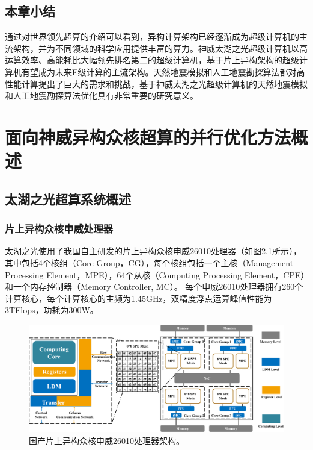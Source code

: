 \documentclass[degree=doctor]{thuthesis}
\begin{document}
\section{本章小结}

通过对世界领先超算的介绍可以看到，异构计算架构已经逐渐成为超级计算机的主流架构，并为不同领域的科学应用提供丰富的算力。神威太湖之光超级计算机以高运算效率、高能耗比大幅领先排名第二的超级计算机，基于片上异构架构的超级计算机有望成为未来E级计算的主流架构。天然地震模拟和人工地震勘探算法都对高性能计算提出了巨大的需求和挑战，基于神威太湖之光超级计算机的天然地震模拟和人工地震勘探算法优化具有非常重要的研究意义。

\chapter{面向神威异构众核超算的并行优化方法概述}
\label{ch:面向神威异构众核超算的并行优化方法概述}
\section{太湖之光超算系统概述}
\subsection{片上异构众核申威处理器}


太湖之光使用了我国自主研发的片上异构众核申威26010处理器（如图\ref{fig:sunwaycpu}所示），其中包括4个核组（Core Group，CG）\citep {fu2016sunway}，每个核组包括一个主核（Management Processing Element，MPE），64个从核（Computing Processing Element，CPE）和一个内存控制器（Memory Controller, MC）。 每个申威26010处理器拥有260个计算核心，每个计算核心的主频为1.45GHz，双精度浮点运算峰值性能为3TFlops，功耗为300W。

\begin{figure}[ht]
\centering
\includegraphics[width=1\columnwidth,page=3]{SW26010架构-crop.pdf}
\caption{国产片上异构众核申威26010处理器架构。}
\label{fig:sunwaycpu}
\end{figure}
\end{document}

